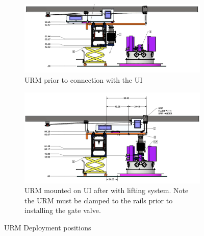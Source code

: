 \documentclass[11pt]{article}
\begin{document}
\begin{figure}
  \begin{subfigure}{0.9\textwidth}
    \includegraphics[width=\textwidth]{Figures/URMPreUIConnection}
    \caption{URM prior to connection with the UI}
    \label{fig:URMpreUI}
  \end{subfigure}
  \begin{subfigure}{0.9\textwidth}
    \includegraphics[width=\textwidth]{Figures/URMMountedOnUI}
    \caption{URM mounted on UI after with lifting system. Note the URM must be clamped to the rails prior to installing the gate valve.}
    \label{fig:URMpreUI}
  \end{subfigure}
  \caption{URM Deployment positions}
  \label{fig:URMDeploy}
\end{figure}
\end{document}
